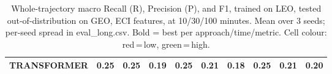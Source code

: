 \begin{table}[t]
{\begin{tabular}{l ccc ccc ccc}
\textbf{TRANSFORMER} & \cellcolor[HTML]{FF6B6B}\textbf{0.25} & \cellcolor[HTML]{FF6B6B}\textbf{0.25} & \cellcolor[HTML]{FF6B6B}0.19 & \cellcolor[HTML]{FF6B6B}\textbf{0.25} & \cellcolor[HTML]{FF6B6B}0.21 & \cellcolor[HTML]{FF6B6B}0.18 & \cellcolor[HTML]{FF6B6B}\textbf{0.25} & \cellcolor[HTML]{FF6B6B}\textbf{0.21} & \cellcolor[HTML]{FF6B6B}\textbf{0.20} \\
\bottomrule
\end{tabular}%
}
\caption{Whole-trajectory macro Recall (R), Precision (P), and F1, trained on LEO, tested out-of-distribution on GEO, ECI features, at 10/30/100 minutes. Mean over 3 seeds; per-seed spread in eval\_long.csv. Bold = best per approach/time/metric. Cell colour: red\,=\,low, green\,=\,high.}
\label{tab:total_leo_to_geo_eci}
\end{table}
